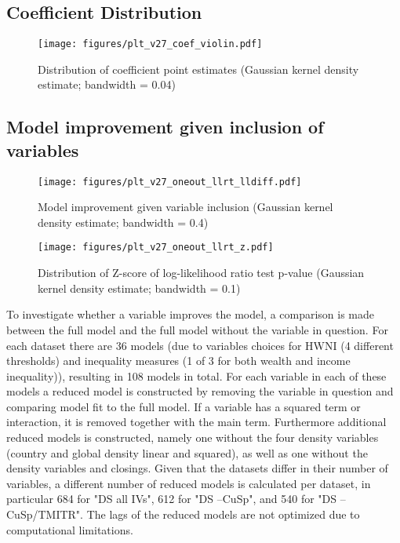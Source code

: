 \documentclass[11pt]{article}
\begin{document}
\subsection{Coefficient Distribution}
\label{app_coefdrbn}
\begin{figure}[htbp]
\centering
\texttt{[image: figures/plt\_v27\_coef\_violin.pdf]}
\caption{\label{fig:coef_violin}Distribution of coefficient point estimates (Gaussian kernel density estimate; bandwidth = 0.04)}
\end{figure}

\FloatBarrier


\subsection{Model improvement given inclusion of variables}
\label{app_llrt}
\begin{figure}[htbp]
\centering
\texttt{[image: figures/plt\_v27\_oneout\_llrt\_lldiff.pdf]}
\caption{\label{fig:oneout_llrt_lldiff}Model improvement given variable inclusion (Gaussian kernel density estimate; bandwidth = 0.4)}
\end{figure}


\begin{figure}[htbp]
\centering
\texttt{[image: figures/plt\_v27\_oneout\_llrt\_z.pdf]}
\caption{\label{fig:oneout_llrt_z}Distribution of Z-score of log-likelihood ratio test p-value (Gaussian kernel density estimate; bandwidth = 0.1)}
\end{figure}

To investigate whether a variable improves the model, a comparison is made between the full model and the full model without the variable in question.
For each dataset there are 36 models (due to variables choices for HWNI (4 different thresholds) and inequality measures (1 of 3 for both wealth and income inequality)), resulting in 108 models in total. 
For each variable in each of these models a reduced model is constructed by removing the variable in question and comparing model fit to the full model.
If a variable has a squared term or interaction, it is removed together with the main term.
Furthermore additional reduced models is constructed, namely one without the four density variables (country and global density linear and squared), as well as one without the density variables and closings.
Given that the datasets differ in their number of variables, a different number of reduced models is calculated per dataset, in particular 684 for "DS all IVs", 612 for "DS --CuSp", and 540 for "DS --CuSp/TMITR". 
The lags of the reduced models are not optimized due to computational limitations. 
\end{document}
